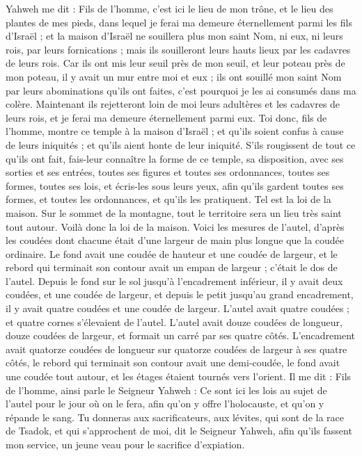 \begin{multicols}{2}
Yahweh me dit : Fils de l’homme, c'est ici le lieu de mon trône, et le lieu des plantes de mes pieds, dans lequel je ferai ma demeure éternellement parmi les fils d'Israël ; et la maison d'Israël ne souillera plus mon saint Nom, ni eux, ni leurs rois, par leurs fornications ; mais ils souilleront leurs hauts lieux par les cadavres de leurs rois.
Car ils ont mis leur seuil près de mon seuil, et leur poteau près de mon poteau, il y avait un mur entre moi et eux ; ils ont souillé mon saint Nom par leurs abominations qu’ils ont faites, c'est pourquoi je les ai consumés dans ma colère.
Maintenant ils rejetteront loin de moi leurs adultères et les cadavres de leurs rois, et je ferai ma demeure éternellement parmi eux.
Toi donc, fils de l’homme, montre ce temple à la maison d’Israël ; et qu'ils soient confus à cause de leurs iniquités ; et qu'ils aient honte de leur iniquité.
S’ils rougissent de tout ce qu'ils ont fait, fais-leur connaître la forme de ce temple, sa disposition, avec ses sorties et ses entrées, toutes ses figures et toutes ses ordonnances, toutes ses formes, toutes ses lois, et écris-les sous leurs yeux, afin qu'ils gardent toutes ses formes, et toutes les ordonnances, et qu'ils les pratiquent.
Tel est la loi de la maison. Sur le sommet de la montagne, tout le territoire sera un lieu très saint tout autour. Voilà donc la loi de la maison.
Voici les mesures de l'autel, d’après les coudées dont chacune était d’une largeur de main plus longue que la coudée ordinaire. Le fond avait une coudée de hauteur et une coudée de largeur, et le rebord qui terminait son contour avait un empan de largeur ; c’était le dos de l’autel.
Depuis le fond sur le sol jusqu’à l’encadrement inférieur, il y avait deux coudées, et une coudée de largeur, et depuis le petit jusqu’au grand encadrement, il y avait quatre coudées et une coudée de largeur.
L’autel avait quatre coudées ; et quatre cornes s’élevaient de l’autel.
L’autel avait douze coudées de longueur, douze coudées de largeur, et formait un carré par ses quatre côtés.
L’encadrement avait quatorze coudées de longueur sur quatorze coudées de largeur à ses quatre côtés, le rebord qui terminait son contour avait une demi-coudée, le fond avait une coudée tout autour, et les étages étaient tournés vers l’orient.
Il me dit : Fils de l’homme, ainsi parle le Seigneur Yahweh : Ce sont ici les lois au sujet de l'autel pour le jour où on le fera, afin qu'on y offre l'holocauste, et qu'on y répande le sang.
Tu donneras aux sacrificateurs, aux lévites, qui sont de la race de Tsadok, et qui s’approchent de moi, dit le Seigneur Yahweh, afin qu'ils fassent mon service, un jeune veau pour le sacrifice d’expiation.

\end{multicols}
